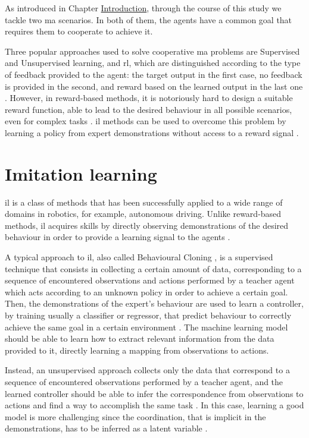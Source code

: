 As introduced in Chapter \hyperref[chap:intro]{Introduction}, through the course 
of this study we tackle two \gls{ma} scenarios. In both of them, the agents have a 
common goal that requires them to cooperate to achieve it. 

Three popular approaches used to solve cooperative \gls{ma} problems are 
Supervised and Unsupervised learning, and \gls{rl}, which are distinguished 
according to the type of feedback provided to the agent: the target output in the 
first case, no feedback is provided in the second, and reward based on the learned 
output in the last one \cite[][]{panait2005cooperative}.
However, in reward-based methods, it is notoriously hard to design a suitable 
reward function, able to lead to the desired behaviour in all possible scenarios, 
even for complex tasks \cite[][]{hadfield2017inverse}.
\gls{il} methods can be used to overcome this problem by learning a policy from 
expert demonstrations without access to a reward signal \cite[][]{song2018multi}.

\section{Imitation learning}
\label{sec:imitlrng}

\gls{il} is a class of methods that has been successfully applied to a wide range of 
domains in robotics, for example, autonomous driving.
Unlike reward-based methods, \gls{il} acquires skills by directly observing 
demonstrations of the desired behaviour in order to provide a learning signal to 
the agents \cite[][]{zhang2018deep}.

A typical approach to \gls{il}, also called Behavioural Cloning 
\cite[][]{torabi2018behavioral}, is a supervised technique that consists in 
collecting a certain amount of data, corresponding to a sequence of encountered 
observations and actions performed by a teacher agent which acts according to 
an unknown policy in order to achieve a certain goal.
Then, the demonstrations of the expert’s behaviour are used to learn a controller, 
by training usually a classifier or regressor, that predict behaviour to correctly 
achieve the same goal in a certain environment \cite[][]{ross2011reduction}.
The machine learning model should be able to learn how to extract relevant 
information from the data provided to it, directly learning a mapping from 
observations to actions.

Instead, an unsupervised approach collects only the data that correspond to a 
sequence of encountered observations performed by a teacher agent, and the 
learned controller should be able to infer the correspondence from observations 
to actions and find a way to accomplish the same task \cite[][]{stadie2017third}.
In this case, learning a good model is more challenging since the coordination, 
that is implicit in the demonstrations, has to be inferred as a latent variable 
\cite[][]{le2017coordinated}.

